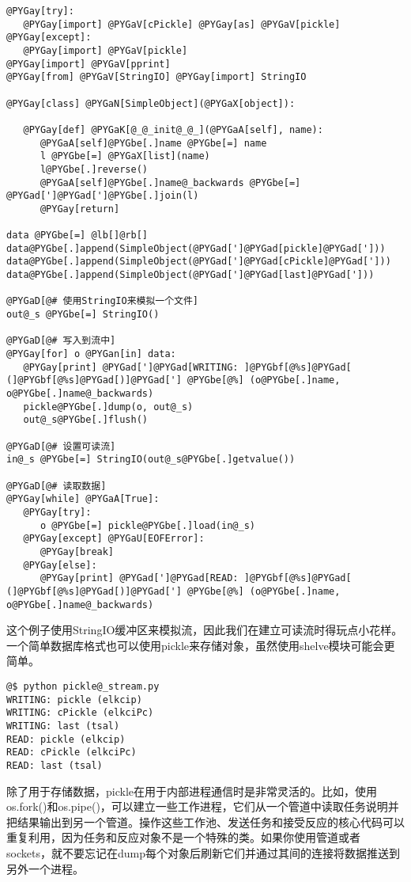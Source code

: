 \documentclass[a4paper,10pt,english]{manual}
\begin{document}
\begin{Verbatim}[commandchars=@\[\]]
@PYGay[try]:
   @PYGay[import] @PYGaV[cPickle] @PYGay[as] @PYGaV[pickle]
@PYGay[except]:
   @PYGay[import] @PYGaV[pickle]
@PYGay[import] @PYGaV[pprint]
@PYGay[from] @PYGaV[StringIO] @PYGay[import] StringIO

@PYGay[class] @PYGaN[SimpleObject](@PYGaX[object]):

   @PYGay[def] @PYGaK[@_@_init@_@_](@PYGaA[self], name):
      @PYGaA[self]@PYGbe[.]name @PYGbe[=] name
      l @PYGbe[=] @PYGaX[list](name)
      l@PYGbe[.]reverse()
      @PYGaA[self]@PYGbe[.]name@_backwards @PYGbe[=] @PYGad[']@PYGad[']@PYGbe[.]join(l)
      @PYGay[return]

data @PYGbe[=] @lb[]@rb[]
data@PYGbe[.]append(SimpleObject(@PYGad[']@PYGad[pickle]@PYGad[']))
data@PYGbe[.]append(SimpleObject(@PYGad[']@PYGad[cPickle]@PYGad[']))
data@PYGbe[.]append(SimpleObject(@PYGad[']@PYGad[last]@PYGad[']))

@PYGaD[@# 使用StringIO来模拟一个文件]
out@_s @PYGbe[=] StringIO()

@PYGaD[@# 写入到流中]
@PYGay[for] o @PYGan[in] data:
   @PYGay[print] @PYGad[']@PYGad[WRITING: ]@PYGbf[@%s]@PYGad[ (]@PYGbf[@%s]@PYGad[)]@PYGad['] @PYGbe[@%] (o@PYGbe[.]name, o@PYGbe[.]name@_backwards)
   pickle@PYGbe[.]dump(o, out@_s)
   out@_s@PYGbe[.]flush()

@PYGaD[@# 设置可读流]
in@_s @PYGbe[=] StringIO(out@_s@PYGbe[.]getvalue())

@PYGaD[@# 读取数据]
@PYGay[while] @PYGaA[True]:
   @PYGay[try]:
      o @PYGbe[=] pickle@PYGbe[.]load(in@_s)
   @PYGay[except] @PYGaU[EOFError]:
      @PYGay[break]
   @PYGay[else]:
      @PYGay[print] @PYGad[']@PYGad[READ: ]@PYGbf[@%s]@PYGad[ (]@PYGbf[@%s]@PYGad[)]@PYGad['] @PYGbe[@%] (o@PYGbe[.]name, o@PYGbe[.]name@_backwards)
\end{Verbatim}

这个例子使用StringIO缓冲区来模拟流，因此我们在建立可读流时得玩点小花样。一个简单数据库格式也可以使用pickle来存储对象，虽然使用shelve模块可能会更简单。

\begin{Verbatim}[commandchars=@\[\]]
@$ python pickle@_stream.py
WRITING: pickle (elkcip)
WRITING: cPickle (elkciPc)
WRITING: last (tsal)
READ: pickle (elkcip)
READ: cPickle (elkciPc)
READ: last (tsal)
\end{Verbatim}

除了用于存储数据，pickle在用于内部进程通信时是非常灵活的。比如，使用os.fork()和os.pipe()，可以建立一些工作进程，它们从一个管道中读取任务说明并把结果输出到另一个管道。操作这些工作池、发送任务和接受反应的核心代码可以重复利用，因为任务和反应对象不是一个特殊的类。如果你使用管道或者sockets，就不要忘记在dump每个对象后刷新它们并通过其间的连接将数据推送到另外一个进程。
\end{document}
